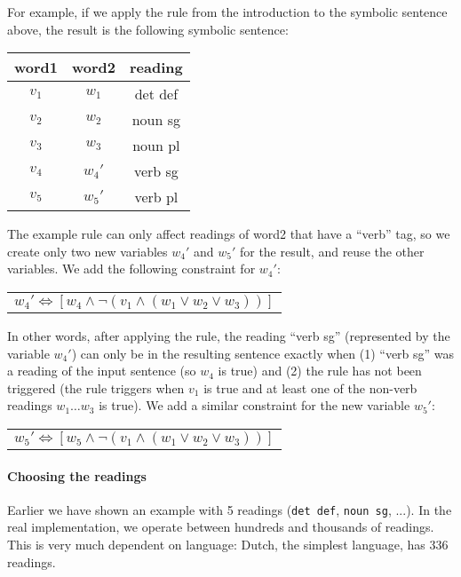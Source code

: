 For example, if we apply the rule from the introduction to the symbolic sentence above, the result is the following symbolic sentence:
\begin{center}
\begin{tabular}{c|c|c}
word1 & word2 & reading \\
\hline
$v_1$ & $w_1$ & det def \\
$v_2$ & $w_2$ & noun sg \\
$v_3$ & $w_3$ & noun pl \\
$v_4$ & $w_4'$ & verb sg \\
$v_5$ & $w_5'$ & verb pl \\
\end{tabular}
\end{center}
The example rule can only affect readings of word2 that have a ``verb'' tag, so we create only two new variables $w_4'$ and $w_5'$ for the result, and reuse the other variables. We add the following constraint for $w_4'$:
\begin{center}
\begin{tabular}{c}
$w_4' \Leftrightarrow [ w_4 \wedge \neg{}(v_1 \wedge (w_1 \vee w_2 \vee w_3)) ]$ \\
\end{tabular}
\end{center}
In other words, after applying the rule, the reading ``verb sg'' (represented by the variable $w_4'$) can only be in the resulting sentence exactly when (1) ``verb sg'' was a reading of the input sentence (so $w_4$ is true) and (2) the rule has not been triggered (the rule triggers when $v_1$ is true and at least one of the non-verb readings $w_1 \dots w_3$ is true). We add a similar constraint for the new variable $w_5'$:
\begin{center}
\begin{tabular}{c}
$w_5' \Leftrightarrow [ w_5 \wedge \neg{}(v_1 \wedge (w_1 \vee w_2 \vee w_3)) ]$ \\
\end{tabular}
\end{center}

\paragraph{Choosing the readings}

Earlier we have shown an example with 5 readings (\texttt{det def}, \texttt{noun sg}, ...). In the real implementation, we operate between hundreds and thousands of readings. This is very much dependent on language: Dutch, the simplest language, has 336 readings.

